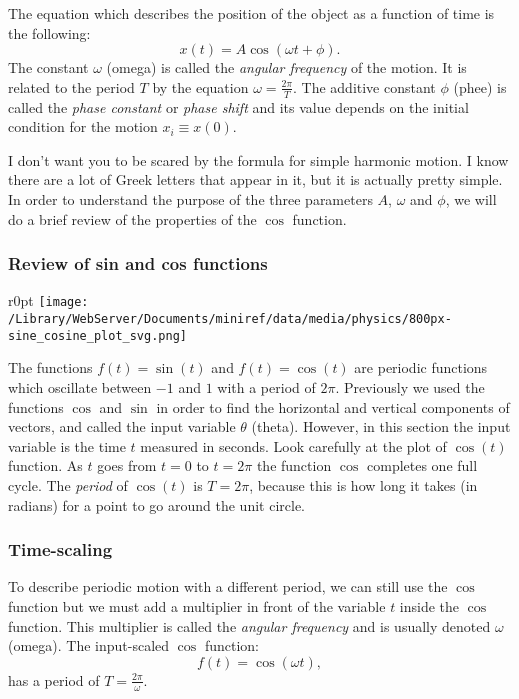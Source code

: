\documentclass[letterpaper,9pt,journal]{IEEEtran}
\newcommand{\dokuitalic}[1]{\textsl{#1}}
\begin{document}
The equation which describes the position of the object as a function of time is the following:  
\[
 x(t)=A\cos(\omega t   + \phi).
\]
The constant $\omega$ (omega) is called the \dokuitalic{angular frequency} of the motion.
It is related to the period $T$ by the equation $\omega = \frac{2\pi}{T}$.
The additive constant $\phi$ (phee) is called the \dokuitalic{phase constant} or \dokuitalic{phase shift}
and its value depends on the initial condition for the motion $x_i\equiv x(0)$.

I don't want you to be scared by the formula for simple harmonic motion.
I know there are a lot of Greek letters that appear in it, but it is actually pretty simple.
In order to understand the purpose of the three parameters $A$, $\omega$ and $\phi$,
we will do a brief review of the properties of the $\cos$ function.

\vspace{-3mm}
\subsubsection{Review of sin and cos functions}

\begin{wrapfigure}{r}{0pt}
\texttt{[image: /Library/WebServer/Documents/miniref/data/media/physics/800px-sine\_cosine\_plot\_svg.png]}
\end{wrapfigure}

The functions $f(t)=\sin(t)$ and $f(t)=\cos(t)$ are periodic functions 
which oscillate between $-1$ and $1$ with a period of $2\pi$.
Previously we used the functions $\cos$ and $\sin$ in order to find the horizontal and vertical components of vectors,
and called the input variable $\theta$ (theta).
However, in this section the input variable is the time $t$ measured in seconds.
Look carefully at the plot of $\cos(t)$ function.
As $t$ goes from $t=0$ to $t=2\pi$ the function $\cos$ completes one full cycle.
The \dokuitalic{period} of $\cos(t)$ is $T=2\pi$, because this is how long it takes 
(in radians) for a point to go around the unit circle.


\subsubsection{Time-scaling}

To describe periodic motion with a different period, 
we can still use the $\cos$ function but we must add 
a multiplier in front of the variable $t$ inside the $\cos$ function.
This multiplier is called the \dokuitalic{angular frequency} and is usually denoted $\omega$ (omega).
The input-scaled $\cos$ function:
\[
 f(t) = \cos(\omega t ),
\]
has a period of $T=\frac{2\pi}{\omega}$.
\end{document}
